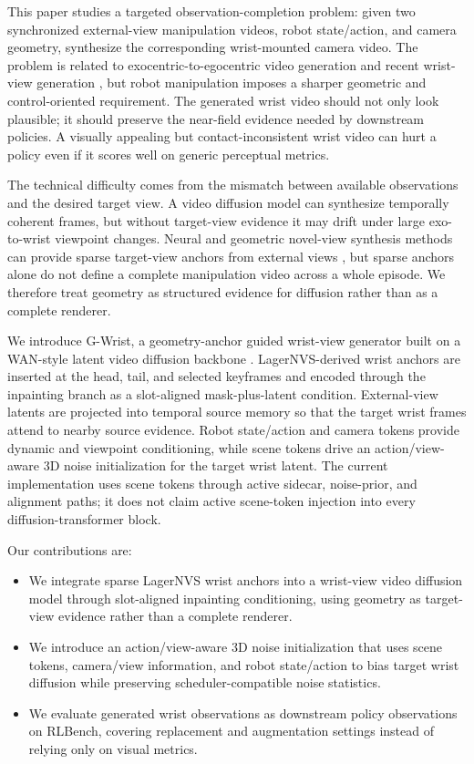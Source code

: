 \documentclass[letterpaper]{article}
\newcommand{\method}{G-Wrist}
\begin{document}
This paper studies a targeted observation-completion problem: given two synchronized external-view manipulation videos, robot state/action, and camera geometry, synthesize the corresponding wrist-mounted camera video.
The problem is related to exocentric-to-egocentric video generation \cite{liu2024exo2ego,xu2025egoexogen,park2026egoworld} and recent wrist-view generation \cite{qian2025wristworld}, but robot manipulation imposes a sharper geometric and control-oriented requirement.
The generated wrist video should not only look plausible; it should preserve the near-field evidence needed by downstream policies.
A visually appealing but contact-inconsistent wrist video can hurt a policy even if it scores well on generic perceptual metrics.

The technical difficulty comes from the mismatch between available observations and the desired target view.
A video diffusion model can synthesize temporally coherent frames, but without target-view evidence it may drift under large exo-to-wrist viewpoint changes.
Neural and geometric novel-view synthesis methods can provide sparse target-view anchors from external views \cite{wang2024dust3r,leroy2024mastr,wang2025vggt,szymanowicz2026lagernvs}, but sparse anchors alone do not define a complete manipulation video across a whole episode.
We therefore treat geometry as structured evidence for diffusion rather than as a complete renderer.

We introduce \method, a geometry-anchor guided wrist-view generator built on a WAN-style latent video diffusion backbone \cite{wan2025wan}.
LagerNVS-derived wrist anchors are inserted at the head, tail, and selected keyframes and encoded through the inpainting branch as a slot-aligned mask-plus-latent condition.
External-view latents are projected into temporal source memory so that the target wrist frames attend to nearby source evidence.
Robot state/action and camera tokens provide dynamic and viewpoint conditioning, while scene tokens drive an action/view-aware 3D noise initialization for the target wrist latent.
The current implementation uses scene tokens through active sidecar, noise-prior, and alignment paths; it does not claim active scene-token injection into every diffusion-transformer block.

Our contributions are:
\begin{itemize}
    \item We integrate sparse LagerNVS wrist anchors into a wrist-view video diffusion model through slot-aligned inpainting conditioning, using geometry as target-view evidence rather than a complete renderer.
    \item We introduce an action/view-aware 3D noise initialization that uses scene tokens, camera/view information, and robot state/action to bias target wrist diffusion while preserving scheduler-compatible noise statistics.
    \item We evaluate generated wrist observations as downstream policy observations on RLBench, covering replacement and augmentation settings instead of relying only on visual metrics.
\end{itemize}
\end{document}
